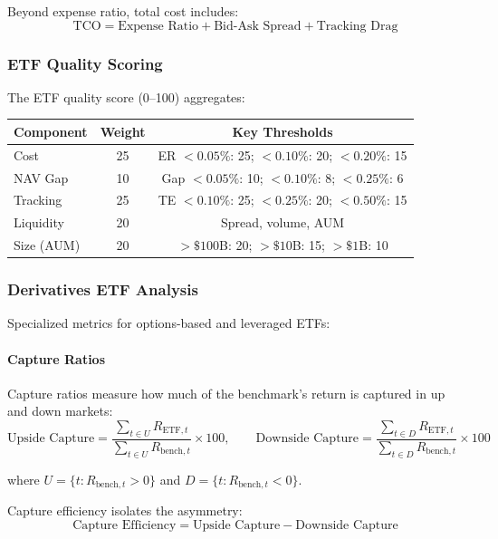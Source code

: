 Beyond expense ratio, total cost includes:
\[
\text{TCO} = \text{Expense Ratio} + \text{Bid-Ask Spread} + \text{Tracking Drag}
\]

\subsubsection{ETF Quality Scoring}

The ETF quality score (0--100) aggregates:

\begin{center}
\begin{tabular}{lcc}
\textbf{Component} & \textbf{Weight} & \textbf{Key Thresholds} \\
\hline
Cost & 25 & ER $< 0.05\%$: 25; $< 0.10\%$: 20; $< 0.20\%$: 15 \\
NAV Gap & 10 & Gap $< 0.05\%$: 10; $< 0.10\%$: 8; $< 0.25\%$: 6 \\
Tracking & 25 & TE $< 0.10\%$: 25; $< 0.25\%$: 20; $< 0.50\%$: 15 \\
Liquidity & 20 & Spread, volume, AUM \\
Size (AUM) & 20 & $> \$100$B: 20; $> \$10$B: 15; $> \$1$B: 10 \\
\end{tabular}
\end{center}

\subsubsection{Derivatives ETF Analysis}

Specialized metrics for options-based and leveraged ETFs:

\paragraph{Capture Ratios}

Capture ratios measure how much of the benchmark's return is captured in up and down markets:
\[
\text{Upside Capture} = \frac{\sum_{t \in U} R_{\text{ETF},t}}{\sum_{t \in U} R_{\text{bench},t}} \times 100, \qquad
\text{Downside Capture} = \frac{\sum_{t \in D} R_{\text{ETF},t}}{\sum_{t \in D} R_{\text{bench},t}} \times 100
\]

where $U = \{t : R_{\text{bench},t} > 0\}$ and $D = \{t : R_{\text{bench},t} < 0\}$.

Capture efficiency isolates the asymmetry:
\[
\text{Capture Efficiency} = \text{Upside Capture} - \text{Downside Capture}
\]

